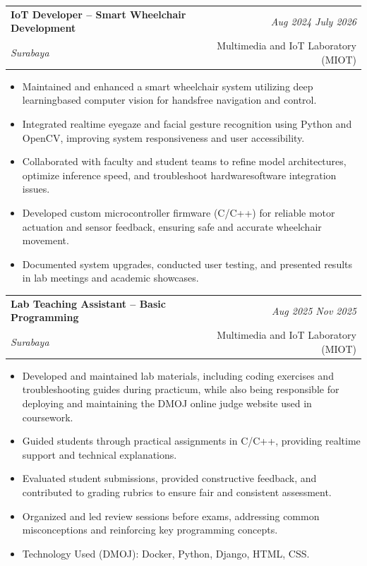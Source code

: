 \documentclass[a4paper,11pt]{article}
\makeatletter
\newcommand{\resumeSubheading}[4]{
\vspace{0.5mm}\item
    \begin{tabular*}{0.98\textwidth}[t]{l@{\extracolsep{\fill}}r}
        \textbf{#1} & \textit{\footnotesize{#4}} \\
        \textit{\footnotesize{#3}} &  \footnotesize{#2}\\
    \end{tabular*}
    \vspace{-2.4mm}
}
\newcommand{\resumeItemListStart}{\begin{justify}\begin{itemize}[leftmargin=3ex, rightmargin=2ex, noitemsep,labelsep=1.2mm,itemsep=0mm]\small}
\newcommand{\resumeItemListEnd}{\end{itemize}\end{justify}\vspace{-2mm}}
\makeatother
\begin{document}
\newpage
\vspace{-2mm}
\resumeSubheading
{IoT Developer – Smart Wheelchair Development}{Multimedia and IoT Laboratory (MIOT)}
{Surabaya}{Aug 2024 \- July 2026}
\resumeItemListStart
\item {Maintained and enhanced a smart wheelchair system utilizing deep learning\-based computer vision for hands\-free navigation and control.}
\item {Integrated real\-time eye\-gaze and facial gesture recognition using Python and OpenCV, improving system responsiveness and user accessibility.}
\item {Collaborated with faculty and student teams to refine model architectures, optimize inference speed, and troubleshoot hardware\-software integration issues.}
\item {Developed custom microcontroller firmware (C/C++) for reliable motor actuation and sensor feedback, ensuring safe and accurate wheelchair movement.}
\item {Documented system upgrades, conducted user testing, and presented results in lab meetings and academic showcases.}
\resumeItemListEnd

\resumeSubheading
{Lab Teaching Assistant – Basic Programming}{Multimedia and IoT Laboratory (MIOT)}
{Surabaya}{Aug 2025 \- Nov 2025}
\resumeItemListStart
\item {Developed and maintained lab materials, including coding exercises and troubleshooting guides during practicum, while also being responsible for deploying and maintaining the DMOJ online judge website used in coursework.}
\item {Guided students through practical assignments in C/C++, providing real\-time support and technical explanations.}
\item {Evaluated student submissions, provided constructive feedback, and contributed to grading rubrics to ensure fair and consistent assessment.}
\item {Organized and led review sessions before exams, addressing common misconceptions and reinforcing key programming concepts.}
\item {Technology Used (DMOJ): Docker, Python, Django, HTML, CSS.}
\resumeItemListEnd
\vspace{-2mm}
\end{document}
